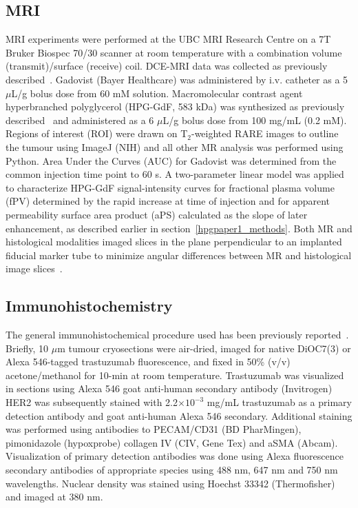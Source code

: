 \subsection{MRI}
MRI experiments were performed at the UBC MRI Research Centre on a 7T Bruker Biospec 70/30 scanner at room temperature with a combination volume (transmit)/surface (receive) coil.
\acs{DCE-MRI} data was collected as previously described~\cite{Baker:2015cob}.
Gadovist (Bayer Healthcare) was administered by \acs{i.v.} catheter as a 5 $\mu$L/g bolus dose from 60 mM solution.
Macromolecular contrast agent hyperbranched polyglycerol (\acs{HPG-GdF}, 583 kDa) was synthesized as previously described~\cite{Kainthan:2006ce,Saatchi:2012hc} and administered as a 6 $\mu$L/g bolus dose from 100 mg/mL (0.2 mM).
Regions of interest (ROI) were drawn on T$_2$-weighted \acs{RARE} images to outline the tumour using ImageJ (NIH) and all other MR analysis was performed using Python.
Area Under the Curves (AUC) for Gadovist was determined from the common injection time point to 60 s.
A two-parameter linear model was applied to characterize \acs{HPG-GdF} signal-intensity curves for fractional plasma volume (fPV) determined by the rapid increase at time of injection and for apparent permeability surface area product (aPS) calculated as the slope of later enhancement, as described earlier in section~\ref{hpgpaper1_methods}.
Both MR and histological modalities imaged slices in the plane perpendicular to an implanted fiducial marker tube to minimize angular differences between MR and histological image slices~\cite{Bains:2009hh}.

\subsection{Immunohistochemistry}
The general immunohistochemical procedure used has been previously reported~\cite{Baker:2008ci}.
Briefly, 10 $\mu$m tumour cryosections were air-dried, imaged for native DiOC7(3) or Alexa 546-tagged trastuzumab fluorescence, and fixed in 50\% (v/v) acetone/methanol for 10-min at room temperature.
Trastuzumab was visualized in sections using Alexa 546 goat anti-human secondary antibody (Invitrogen)
\acs{HER2} was subsequently stained with 2.2$\times 10^{-3}$ mg/mL trastuzumab as a primary detection antibody and goat anti-human Alexa 546 secondary.
Additional staining was performed using antibodies to PECAM/CD31 (BD PharMingen), pimonidazole (hypoxprobe) collagen IV (\acs{CIV}, Gene Tex) and \acs{aSMA} (Abcam).
Visualization of primary detection antibodies was done using Alexa fluorescence secondary antibodies of appropriate species using 488 nm, 647 nm and 750 nm wavelengths.
Nuclear density was stained using Hoechst 33342 (Thermofisher) and imaged at 380 nm.

